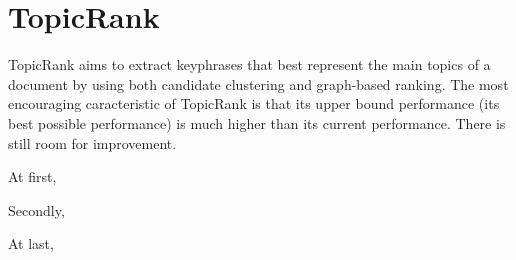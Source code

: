\section{TopicRank}
\label{sec:topicrank}
  TopicRank aims to extract keyphrases that best represent the main topics of a
  document by using both candidate clustering and graph-based ranking. The most
  encouraging caracteristic of TopicRank is that its upper bound performance
  (its best possible performance) is much higher than its current performance.
  There is still room for improvement.

  At first, 

  Secondly, 

  At last, 


